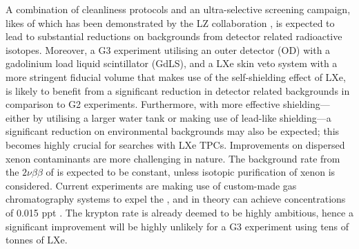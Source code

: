 A combination of cleanliness protocols and an ultra-selective screening campaign, likes of which has been demonstrated by the LZ collaboration \cite{lz_screening}, is expected to lead to substantial reductions on backgrounds from detector related radioactive isotopes. Moreover, a G3 experiment utilising an outer detector (OD) with a gadolinium load liquid scintillator (GdLS), and a LXe skin veto system with a more stringent fiducial volume that makes use of the self-shielding effect of LXe, is likely to benefit from a significant reduction in detector related backgrounds in comparison to G2 experiments. Furthermore, with more effective shielding---either by utilising a larger water tank or making use of lead-like shielding---a significant reduction on environmental backgrounds may also be expected; this becomes highly crucial for \neutrinolessDoubleBeta{} searches with LXe TPCs. Improvements on dispersed xenon contaminants are more challenging in nature. The background rate from the $2\nu\beta\beta$ of \XeOTS{} is expected to be constant, unless isotopic purification of xenon is considered. Current experiments are making use of custom-made gas chromatography systems to expel the \KrEF{}, and in theory can achieve \KrEF{} concentrations of 0.015 ppt \cite{lz_tdr}. The krypton rate is already deemed to be highly ambitious, hence a significant improvement will be highly unlikely for a G3 experiment using tens of tonnes of LXe. 

